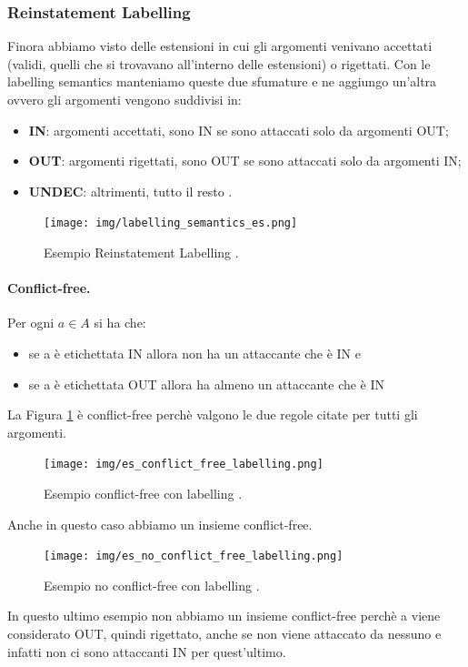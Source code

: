\subsubsection{Reinstatement Labelling}
Finora abbiamo visto delle estensioni in cui gli argomenti venivano accettati (validi, quelli che si trovavano all'interno delle estensioni) o rigettati. Con le labelling semantics manteniamo queste due sfumature e ne aggiungo un'altra ovvero gli argomenti vengono suddivisi in:
\begin{itemize}
    \item \textbf{IN}: argomenti accettati, sono IN se sono attaccati solo da argomenti OUT;
    \item \textbf{OUT}: argomenti rigettati, sono OUT se sono attaccati solo da argomenti IN;
    \item \textbf{UNDEC}: altrimenti, tutto il resto .
\end{itemize}
\begin{figure}[H]
    \centering
    \texttt{[image: img/labelling\_semantics\_es.png]}
    \caption{Esempio Reinstatement Labelling .}\label{fig:es_Reinstatement_Labelling}
\end{figure}

\paragraph{Conflict-free.}
Per ogni $a \in A$ si ha che:
\begin{itemize}
    \item se a è etichettata IN allora non ha un attaccante che è IN e
    \item se a è etichettata OUT allora ha almeno un attaccante che è IN
\end{itemize}
La Figura \ref{fig:es_Reinstatement_Labelling} è conflict-free perchè valgono le due regole citate per tutti gli argomenti. 

\begin{figure}[H]
    \centering
    \texttt{[image: img/es\_conflict\_free\_labelling.png]}
    \caption{Esempio conflict-free con labelling .}\label{fig:es_conflict_free}
\end{figure}
Anche in questo caso abbiamo un insieme conflict-free.
\begin{figure}[H]
    \centering
    \texttt{[image: img/es\_no\_conflict\_free\_labelling.png]}
    \caption{Esempio no conflict-free con labelling .}\label{fig:es_noconflict_free}
\end{figure}
In questo ultimo esempio non abbiamo un insieme conflict-free perchè a viene considerato OUT, quindi rigettato, anche se non viene attaccato da nessuno e infatti non ci sono attaccanti IN per quest'ultimo.

